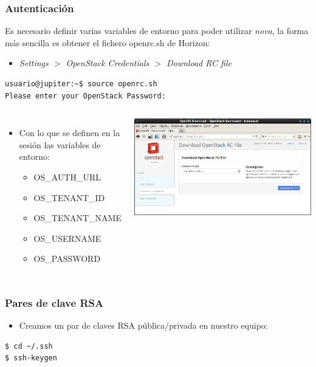 \documentclass{beamer}
\begin{document}
\begin{frame}[fragile]
  \frametitle{Autenticación}
  Es necesario definir varias variables de entorno para poder utilizar
  \textit{nova}, la forma más sencilla es obtener el fichero openrc.sh de
  Horizon:
  \begin{itemize}
  \item \textit{Settings $>$ OpenStack Credentials $>$ Download RC file}
  \end{itemize}
\begin{verbatim}
usuario@jupiter:~$ source openrc.sh 
Please enter your OpenStack Password:
\end{verbatim}
  \begin{columns}
    \begin{itemize}
    \item Con lo que se definen en la sesión las variables de entorno:
      \begin{itemize}
      \item OS\_AUTH\_URL
      \item OS\_TENANT\_ID
      \item OS\_TENANT\_NAME
      \item OS\_USERNAME
      \item OS\_PASSWORD
      \end{itemize}
    \end{itemize}
    \includegraphics[width=\columnwidth]{../img/nova1.png}
  \end{columns}
\end{frame}
\begin{frame}
  \frametitle{Pares de clave RSA}
  \begin{itemize}
  \item Creamos un par de claves RSA pública/privada en nuestro equipo:
  \end{itemize}
\begin{verbatim}
$ cd ~/.ssh
$ ssh-keygen
\end{verbatim}
\end{frame}
\end{document}

